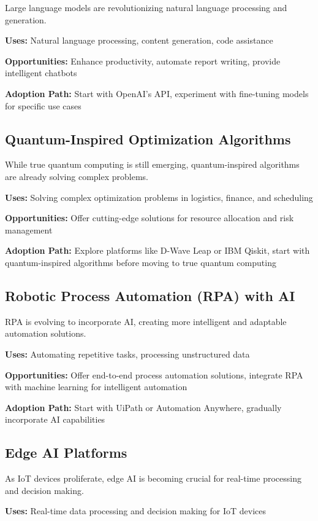 Large language models are revolutionizing natural language processing and generation.

\textbf{Uses:} Natural language processing, content generation, code assistance

\textbf{Opportunities:} Enhance productivity, automate report writing, provide intelligent chatbots

\textbf{Adoption Path:} Start with OpenAI's API, experiment with fine-tuning models for specific use cases

\subsection{Quantum-Inspired Optimization Algorithms}

While true quantum computing is still emerging, quantum-inspired algorithms are already solving complex problems.

\textbf{Uses:} Solving complex optimization problems in logistics, finance, and scheduling

\textbf{Opportunities:} Offer cutting-edge solutions for resource allocation and risk management

\textbf{Adoption Path:} Explore platforms like D-Wave Leap or IBM Qiskit, start with quantum-inspired algorithms before moving to true quantum computing

\subsection{Robotic Process Automation (RPA) with AI}

RPA is evolving to incorporate AI, creating more intelligent and adaptable automation solutions.

\textbf{Uses:} Automating repetitive tasks, processing unstructured data

\textbf{Opportunities:} Offer end-to-end process automation solutions, integrate RPA with machine learning for intelligent automation

\textbf{Adoption Path:} Start with UiPath or Automation Anywhere, gradually incorporate AI capabilities
%
\subsection{Edge AI Platforms}

As IoT devices proliferate, edge AI is becoming crucial for real-time processing and decision making.

\textbf{Uses:} Real-time data processing and decision making for IoT devices


